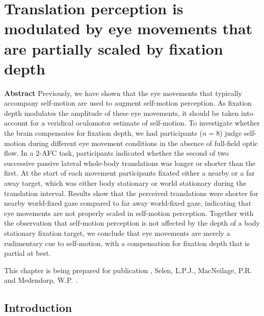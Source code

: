 \thispagestyle{empty}

\chapter{Translation perception is modulated by eye movements that are partially scaled by fixation depth}
\chaptermark{}

\newpage

\small {\bf Abstract}
Previously, we have shown that the eye movements that typically accompany self-motion are used to augment self-motion perception. As fixation depth modulates the amplitude of these eye movements, it should be taken into account for a veridical oculomotor estimate of self-motion. To investigate whether the brain compensates for fixation depth, we had  participants ($n = 8$) judge self-motion during different eye movement conditions in the absence of full-field optic flow.  In a 2-AFC task, participants indicated whether the second of two successive passive lateral whole-body translations was longer or shorter than the first. At the start of each movement participants fixated either a nearby or a far away target, which was either body stationary or world stationary during the translation interval. Results show that the perceived translations were shorter for nearby world-fixed gaze compared to far away world-fixed gaze, indicating that eye movements are not properly scaled in self-motion perception. Together with the observation that self-motion perception is not affected by the depth of a body stationary fixation target, we conclude that eye movements are merely a rudimentary cue to self-motion, with a compensation for fixation depth that is partial at best.

\vfill

\noindent\underline{ \hspace{4cm} }

\noindent This chapter is being prepared for publication \newline
{}, Selen, L.P.J., MacNeilage, P.R. and Medendorp, W.P. \citeyear{clemens2015b}. %

\newpage




\section{Introduction}

